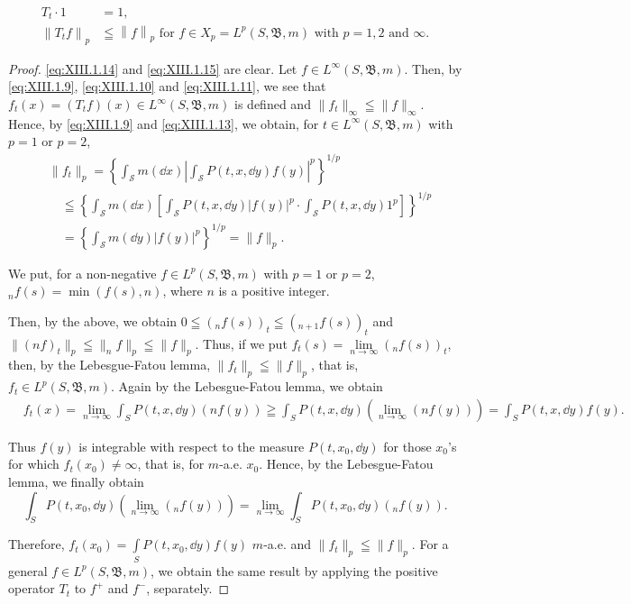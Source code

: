 \begin{align}
T _{t} \cdot 1& = 1, \label{eq:XIII.1.15} \\
\left\| T _{t} f \right\| _{p}& \leqq \left\| f \right\| _{p} \text{ for } f \in X _{p} = L ^{p} (S, \mathfrak {B}, m) \text{ with } p = 1, 2 \text{ and } \infty . \label{eq:XIII.1.16}
\end{align}

\begin{proof}
 \eqref{eq:XIII.1.14} and \eqref{eq:XIII.1.15} are clear. Let $f \in L^{\infty}(S, \mathfrak{B}, m)$. Then, by \eqref{eq:XIII.1.9}, \eqref{eq:XIII.1.10} and \eqref{eq:XIII.1.11}, we see that $f_t(x) = (T_t f)(x) \in L^{\infty}(S, \mathfrak{B}, m)$ is defined and $\|f_t\|_{\infty} \leqq \|f\|_{\infty}$. Hence, by \eqref{eq:XIII.1.9} and \eqref{eq:XIII.1.13}, we obtain, for $t \in L^{\infty}(S, \mathfrak{B}, m)$ with $p = 1$ or $p = 2$, 
\[
\begin{aligned} & {\| f _{t} \| _{p} = \left\{\int_ {\mathcal {S}} m (\dd x) \left| \int_ {\mathcal {S}} P (t, x, \dd y) f (y) \right| ^{p} \right\} ^{1/p}} \\ & {\quad \leqq \left\{\int_ {\mathcal {S}} m (\dd x) \left[ \int_ {\mathcal {S}} P (t, x, \dd y) | f (y) | ^{p} \cdot \int_ {\mathcal {S}} P (t, x, \dd y) 1 ^{p} \right] \right\} ^{1/p}} \\ & {\quad = \left\{\int_ {\mathcal {S}} m (\dd y) | f (y) | ^{p} \right\} ^{1/p} = \| f \| _{p}.} \end{aligned}
\]

We put, for a non-negative $f \in L^p(S, \mathfrak{B}, m)$ with $p = 1$ or $p = 2$, 
$_{n}f(s)=\min(f(s),n)$, where $n$ is a positive integer. 

Then, by the above, we obtain $0 \leqq (_n f(s))_t \leqq (_{n+1} f(s))_t$ and $\|(n f)_t\|_p \leqq \|_n f\|_p \leqq \|f\|_p$. Thus, if we put $f_t(s) = \lim\limits_{n \to \infty} (_n f(s))_t$, then, by the Lebesgue-Fatou lemma, $\|f_t\|_p \leqq \|f\|_p$, that is, $f_t \in L^p(S, \mathfrak{B}, m)$. Again by the Lebesgue-Fatou lemma, we obtain 
\[
\begin{aligned}
&f _{t} (x) = \lim\limits _{n \rightarrow \infty} \int_{S} P (t, x, \dd y) (n f (y)) \geqq \int_{S} P (t, x, \dd y) (\lim\limits _{n \rightarrow \infty} (n f (y))) = \int_{S} P (t, x, \dd y) f (y).
\end{aligned}
\]

Thus $f(y)$ is integrable with respect to the measure $P(t, x_0, \dd y)$ for those $x_0$'s for which $f_t(x_0) \neq \infty$, that is, for $m$-a.e. $x_0$. Hence, by the Lebesgue-Fatou lemma, we finally obtain 
\[
\int_{S} P (t, x _{0}, \dd y) \left(\lim\limits _{n \rightarrow \infty} (_{n} f (y))\right) = \lim\limits _{n \rightarrow \infty} \int_{S} P (t, x _{0}, \dd y) (_{n} f (y)).
\]

Therefore, $f_{t}(x_0) = \int \limits_{S} P(t, x_0, \dd y) f(y)$ $m$-a.e. and $\|f_t\|_p \leqq \|f\|_p$. For a general $f \in L^p(S, \mathfrak{B}, m)$, we obtain the same result by applying the positive operator $T_t$ to $f^+$ and $f^-$, separately. 
\end{proof}

